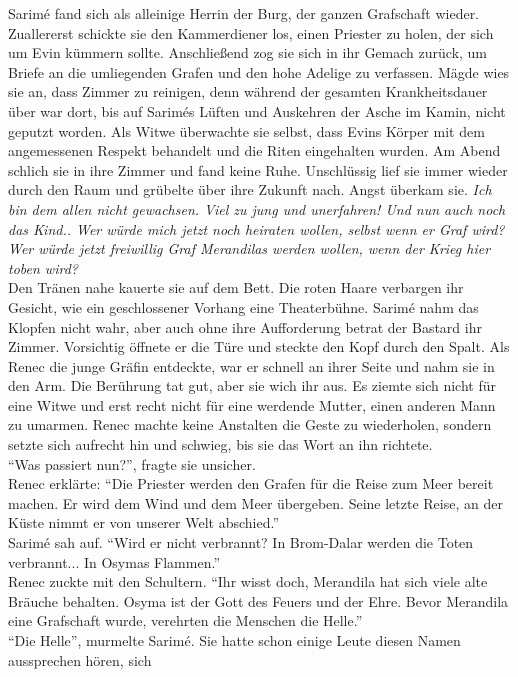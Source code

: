 Sarimé fand sich als alleinige Herrin der Burg, der ganzen Grafschaft wieder. Zuallererst schickte 
sie den Kammerdiener los, einen Priester zu holen, der sich um Evin kümmern sollte. Anschließend 
zog sie sich in ihr Gemach zurück, um Briefe an die umliegenden Grafen und den hohe Adelige zu 
verfassen. Mägde wies sie an, dass Zimmer zu reinigen, denn während der gesamten Krankheitsdauer 
über war dort, bis auf Sarimés Lüften und Auskehren der Asche im Kamin, nicht geputzt worden. Als 
Witwe überwachte sie selbst, dass Evins Körper mit dem angemessenen Respekt behandelt und die Riten 
eingehalten wurden. Am Abend schlich sie in ihre Zimmer und fand keine Ruhe. Unschlüssig lief sie 
immer wieder durch den Raum und grübelte über ihre Zukunft nach. Angst überkam sie.
\textit{Ich bin dem allen nicht gewachsen. Viel zu jung und unerfahren! Und nun auch noch das 
Kind.. Wer würde mich jetzt noch heiraten wollen, selbst wenn er Graf wird? Wer würde jetzt 
freiwillig Graf Merandilas werden wollen, wenn der Krieg hier toben wird?}\\
Den Tränen nahe kauerte sie auf dem Bett. Die roten Haare verbargen ihr Gesicht, wie ein 
geschlossener Vorhang eine Theaterbühne. Sarimé nahm das Klopfen nicht wahr, aber auch ohne ihre 
Aufforderung betrat der Bastard ihr Zimmer. Vorsichtig öffnete er die Türe und steckte den Kopf 
durch den Spalt. Als Renec die junge Gräfin entdeckte, war er schnell an ihrer Seite und nahm sie 
in den Arm. Die Berührung tat gut, aber sie wich ihr aus. Es ziemte sich nicht für eine Witwe und 
erst recht nicht für eine werdende Mutter, einen anderen Mann zu umarmen. Renec machte keine 
Anstalten die Geste zu wiederholen, sondern setzte sich aufrecht hin und schwieg, bis sie das Wort 
an ihn richtete.\\
``Was passiert nun?'', fragte sie unsicher.\\
Renec erklärte: ``Die Priester werden den Grafen für die Reise zum Meer bereit machen. Er wird dem 
Wind und dem Meer übergeben. Seine letzte Reise, an der Küste nimmt er von unserer Welt 
abschied.''\\
Sarimé sah auf. ``Wird er nicht verbrannt? In Brom-Dalar werden die Toten verbrannt... In Osymas 
Flammen.''\\
Renec zuckte mit den Schultern. ``Ihr wisst doch, Merandila hat sich viele alte Bräuche behalten. 
Osyma ist der Gott des Feuers und der Ehre. Bevor Merandila eine Grafschaft wurde, verehrten die 
Menschen die Helle.''\\
``Die Helle'', murmelte Sarimé. Sie hatte schon einige Leute diesen Namen aussprechen hören, sich 
